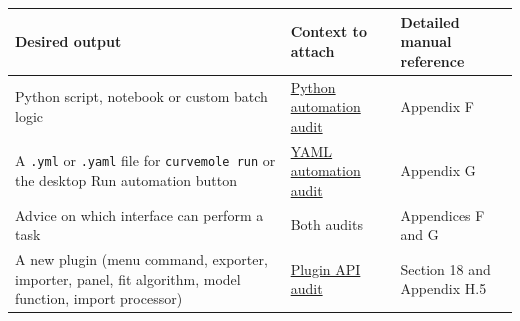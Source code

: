 \documentclass[
  10pt,
  a4paper,
  oneside]{scrreprt}
\begin{document}
\begin{longtable}[]{@{}lll@{}}
\toprule
\begin{minipage}[b]{0.30\columnwidth}\raggedright
Desired output\strut
\end{minipage} & \begin{minipage}[b]{0.30\columnwidth}\raggedright
Context to attach\strut
\end{minipage} & \begin{minipage}[b]{0.30\columnwidth}\raggedright
Detailed manual reference\strut
\end{minipage}\tabularnewline
\midrule
\endhead
\begin{minipage}[t]{0.30\columnwidth}\raggedright
Python script, notebook or custom batch logic\strut
\end{minipage} & \begin{minipage}[t]{0.30\columnwidth}\raggedright
\href{ai-python-audit.md}{Python automation audit}\strut
\end{minipage} & \begin{minipage}[t]{0.30\columnwidth}\raggedright
Appendix F\strut
\end{minipage}\tabularnewline
\begin{minipage}[t]{0.30\columnwidth}\raggedright
A \texttt{.yml} or \texttt{.yaml} file for \texttt{curvemole\ run} or
the desktop Run automation button\strut
\end{minipage} & \begin{minipage}[t]{0.30\columnwidth}\raggedright
\href{ai-yaml-audit.md}{YAML automation audit}\strut
\end{minipage} & \begin{minipage}[t]{0.30\columnwidth}\raggedright
Appendix G\strut
\end{minipage}\tabularnewline
\begin{minipage}[t]{0.30\columnwidth}\raggedright
Advice on which interface can perform a task\strut
\end{minipage} & \begin{minipage}[t]{0.30\columnwidth}\raggedright
Both audits\strut
\end{minipage} & \begin{minipage}[t]{0.30\columnwidth}\raggedright
Appendices F and G\strut
\end{minipage}\tabularnewline
\begin{minipage}[t]{0.30\columnwidth}\raggedright
A new plugin (menu command, exporter, importer, panel, fit algorithm,
model function, import processor)\strut
\end{minipage} & \begin{minipage}[t]{0.30\columnwidth}\raggedright
\href{ai-plugin-audit.md}{Plugin API audit}\strut
\end{minipage} & \begin{minipage}[t]{0.30\columnwidth}\raggedright
Section 18 and Appendix H.5\strut
\end{minipage}\tabularnewline
\bottomrule
\end{longtable}
\end{document}
